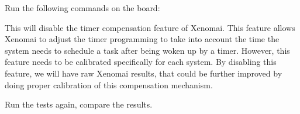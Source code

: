 Run the following commands on the board:


This will disable the timer compensation feature of Xenomai. This
feature allows Xenomai to adjust the timer programming to take into
account the time the system needs to schedule a task after being woken
up by a timer. However, this feature needs to be calibrated
specifically for each system. By disabling this feature, we will have
raw Xenomai results, that could be further improved by doing proper
calibration of this compensation mechanism.

Run the tests again, compare the results.
